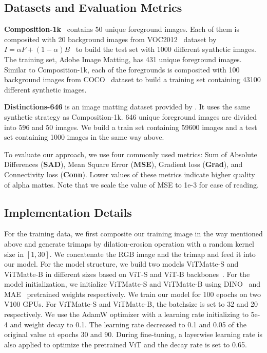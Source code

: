 \documentclass[10pt,twocolumn,letterpaper]{article}
\newcommand{\thename}{ViTMatte}
\begin{document}
\subsection{Datasets and Evaluation Metrics}

\textbf{Composition-1k}~\cite{DIM} contains 50 unique foreground images. Each of them is composited with 20 background images from VOC2012~\cite{voc} dataset by $I = \alpha F + (1-\alpha)B$~\cite{rmat} to build the test set with 1000 different synthetic images. The training set, Adobe Image Matting, has 431 unique foreground images. Similar to Composition-1k, each of the foregrounds is composited with 100 background images from COCO~\cite{mscoco} dataset to build a training set containing 43100 different synthetic images.

\textbf{Distinctions-646} is an image matting dataset provided by \cite{HAttMatting}. It uses the same synthetic strategy as Composition-1k. 646 unique foreground images are divided into 596 and 50 images. We build a train set containing 59600 images and a test set containing 1000 images in the same way above.

To evaluate our approach, we use four commonly used metrics: Sum of Absolute Differences (\textbf{SAD}), Mean Square Error (\textbf{MSE}), Gradient loss (\textbf{Grad}), and Connectivity loss (\textbf{Conn}). Lower values of these metrics indicate higher quality of alpha mattes. Note that we scale the value of MSE to 1e-3 for ease of reading.

\subsection{Implementation Details}
For the training data, we first composite our training image in the way mentioned above and generate trimaps by dilation-erosion operation with a random kernel size in $[1, 30]$. We concatenate the RGB image and the trimap and feed it into our model. For the model structure, we build two models \thename{}-S and \thename{}-B in different sizes based on ViT-S and ViT-B backbones~\cite{vit}.  For the model initialization, we initialize \thename-S and \thename-B using DINO~\cite{dino} and MAE~\cite{he2022masked} pretrained weights respectively. We train our model for 100 epochs on two V100 GPUs. For ViTMatte-S and ViTMatte-B, the batchsize is set to 32 and 20 respectively. We use the AdamW optimizer with a learning rate initializing to 5e-4 and weight decay to 0.1.  The learning rate decreased to 0.1 and 0.05 of the original value at epochs 30 and 90. During fine-tuning, a layerwise learning rate is also applied to optimize the pretrained ViT and the decay rate is set to 0.65.
\end{document}
